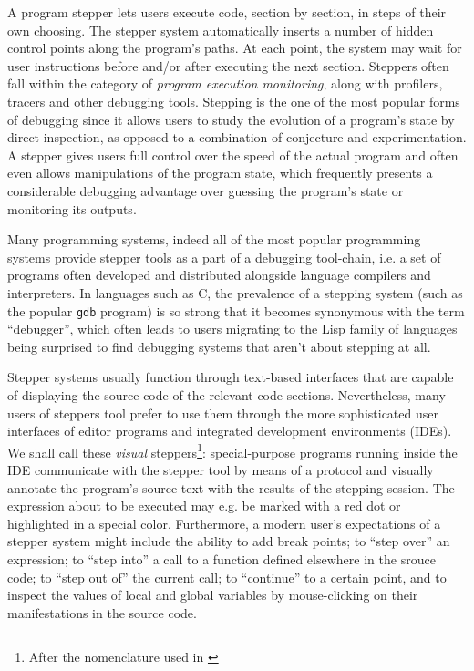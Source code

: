 \documentclass[sigconf]{acmart}
\begin{document}
A program stepper lets users execute code, section by section, in
steps of their own choosing.  The stepper system automatically inserts
a number of hidden control points along the program's paths.  At each
point, the system may wait for user instructions before and/or after
executing the next section.  Steppers often fall within the category
of \emph{program execution monitoring}, along with profilers, tracers
and other debugging tools.  Stepping is the one of the most popular
forms of debugging since it allows users to study the evolution of a
program's state by direct inspection, as opposed to a combination of
conjecture and experimentation.  A stepper gives users full control
over the speed of the actual program and often even allows
manipulations of the program state, which frequently presents a
considerable debugging advantage over guessing the program's state or
monitoring its outputs.

Many programming systems, indeed all of the most popular programming
systems provide stepper tools as a part of a debugging tool-chain,
i.e. a set of programs often developed and distributed alongside
language compilers and interpreters.  In languages such as C, the
prevalence of a stepping system (such as the popular \texttt{gdb}
program) is so strong that it becomes synonymous with the term
``debugger'', which often leads to users migrating to the Lisp family
of languages being surprised to find debugging systems that aren't
about stepping at all.

Stepper systems usually function through text-based interfaces that
are capable of displaying the source code of the relevant code
sections.  Nevertheless, many users of steppers tool prefer to use
them through the more sophisticated user interfaces of editor programs
and integrated development environments (IDEs).  We shall call these
\emph{visual} steppers\footnote{After the nomenclature used in
  \cite{annotation-based}}: special-purpose programs running inside
the IDE communicate with the stepper tool by means of a protocol and
visually annotate the program's source text with the results of the
stepping session.  The expression about to be executed may e.g. be
marked with a red dot or highlighted in a special color.  Furthermore,
a modern user's expectations of a stepper system might include the
ability to add break points; to ``step over'' an expression; to ``step
into'' a call to a function defined elsewhere in the srouce code; to
``step out of'' the current call; to ``continue'' to a certain point,
and to inspect the values of local and global variables by
mouse-clicking on their manifestations in the source code.
\end{document}
